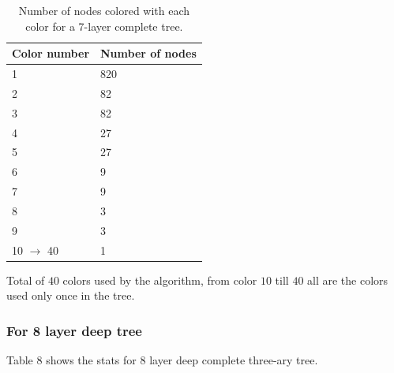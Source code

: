 \documentclass{article}
\theoremstyle{remark}
\begin{document}
\begin{table}[h]
    \centering
    \begin{tabular}{|l|l|}
        \hline
        \textbf{Color number} & \textbf{Number of nodes} \\ \hline
        1                     & 820                         \\ \hline
        2                     & 82                         \\ \hline
        3                     & 82                         \\ \hline
        4                     & 27                         \\ \hline
        5                     & 27                         \\ \hline
        6                     & 9                          \\ \hline
        7                     & 9                          \\ \hline
        8                     & 3                          \\ \hline
        9                     & 3                          \\ \hline
        10 $\to$ 40  & 1\\ \hline
    \end{tabular}
    \caption{Number of nodes colored with each color for a 7-layer complete tree.}
    \label{tab:colors}
\end{table}


Total of $40$ colors used by the algorithm, from color $10$ till $40$ all are the colors used only once in the tree.


\subsubsection{For 8 layer deep tree}
Table $8$ shows the stats for 8 layer deep complete three-ary tree.
\end{document}
